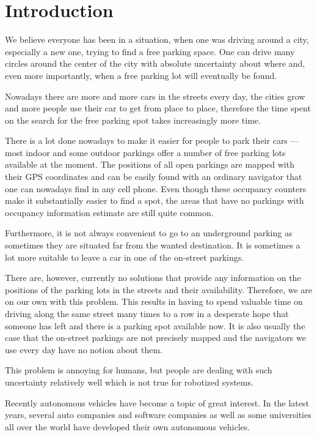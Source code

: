 \chapter{Introduction} %
\label{cha:introduction}
    We believe everyone has been in a situation, when one was driving around a city, especially a new one, trying to find a free parking space. One can drive many circles around the center of the city with absolute uncertainty about where and, even more importantly, when a free parking lot will eventually be found.

    Nowadays there are more and more cars in the streets every day, the cities grow and more people use their car to get from place to place, therefore the time spent on the search for the free parking spot takes increasingly more time.

    There is a lot done nowadays to make it easier for people to park their cars --- most indoor and some outdoor parkings offer a number of free parking lots available at the moment. The positions of all open parkings are mapped with their GPS coordinates and can be easily found with an ordinary navigator that one can nowadays find in any cell phone. Even though these occupancy counters make it substantially easier to find a spot, the areas that have no parkings with occupancy information estimate are still quite common.

    Furthermore, it is not always convenient to go to an underground parking as sometimes they are situated far from the wanted destination. It is sometimes a lot more suitable to leave a car in one of the on-street parkings.

    There are, however, currently no solutions that provide any information on the positions of the parking lots in the streets and their availability. Therefore, we are on our own with this problem. This results in having to spend valuable time on driving along the same street many times to a row in a desperate hope that someone has left and there is a parking spot available now. It is also usually the case that the on-street parkings are not precisely mapped and the navigators we use every day have no notion about them.

    This problem is annoying for humans, but people are dealing with such uncertainty relatively well which is not true for robotized systems.

    Recently autonomous vehicles have become a topic of great interest.
    In the latest years, several auto companies and software companies as well as some universities all over the world have developed their own autonomous vehicles.

